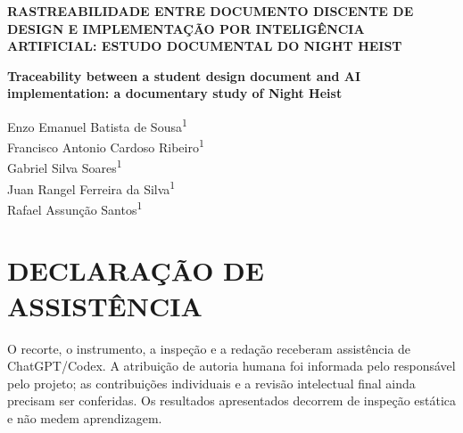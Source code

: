 \documentclass[12pt,a4paper]{article}
\begin{document}
\begin{center}
\textbf{RASTREABILIDADE ENTRE DOCUMENTO DISCENTE DE DESIGN E IMPLEMENTAÇÃO POR INTELIGÊNCIA ARTIFICIAL: ESTUDO DOCUMENTAL DO NIGHT HEIST}\par\medskip
\textbf{Traceability between a student design document and AI implementation: a documentary study of Night Heist}
\end{center}
\begin{flushright}
Enzo Emanuel Batista de Sousa\textsuperscript{1}\\
Francisco Antonio Cardoso Ribeiro\textsuperscript{1}\\
Gabriel Silva Soares\textsuperscript{1}\\
Juan Rangel Ferreira da Silva\textsuperscript{1}\\
Rafael Assunção Santos\textsuperscript{1}
\end{flushright}

\par\medskip{}

\section*{DECLARAÇÃO DE ASSISTÊNCIA}
O recorte, o instrumento, a inspeção e a redação receberam assistência de ChatGPT/Codex. A atribuição de autoria humana foi informada pelo responsável pelo projeto; as contribuições individuais e a revisão intelectual final ainda precisam ser conferidas. Os resultados apresentados decorrem de inspeção estática e não medem aprendizagem.

\end{document}
